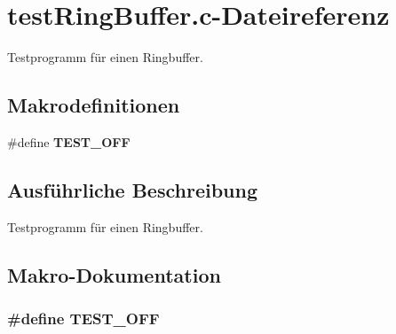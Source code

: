 \section{testRingBuffer.c-\/Dateireferenz}
\label{test_ring_buffer_8c}


Testprogramm für einen Ringbuffer.  


\subsection*{Makrodefinitionen}
\begin{DoxyCompactItemize}
\item 
\#define {\bf TEST\_\-OFF}
\end{DoxyCompactItemize}


\subsection{Ausführliche Beschreibung}
Testprogramm für einen Ringbuffer. 

\subsection{Makro-\/Dokumentation}
\subsubsection[{TEST\_\-OFF}]{\setlength{\rightskip}{0pt plus 5cm}\#define TEST\_\-OFF}\label{test_ring_buffer_8c_a8f6764e8e57eabbb14922404c0e25175}
